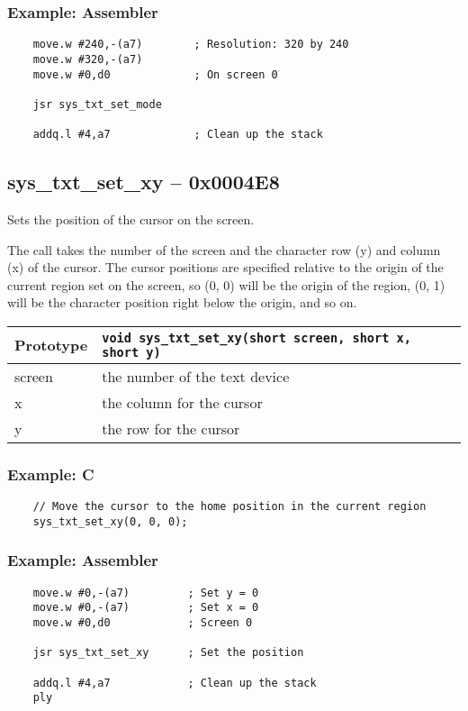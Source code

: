 \subsubsection*{Example: Assembler}
\begin{verbatim}
    move.w #240,-(a7)        ; Resolution: 320 by 240
    move.w #320,-(a7)
    move.w #0,d0             ; On screen 0
    
    jsr sys_txt_set_mode

    addq.l #4,a7             ; Clean up the stack
\end{verbatim}


\subsection*{sys\_txt\_set\_xy -- 0x0004E8}
Sets the position of the cursor on the screen.

The call takes the number of the screen and the character row (y) and column (x) of the cursor.
The cursor positions are specified relative to the origin of the current region set on the screen, so (0, 0)
will be the origin of the region, (0, 1) will be the character position right below the origin, and so on.

\bigskip

\begin{tabular}{|l||l|} \hline
Prototype & \lstinline!void sys_txt_set_xy(short screen, short x, short y)! \\ \hline
screen & the number of the text device \\ \hline
x & the column for the cursor \\ \hline
y & the row for the cursor \\ \hline
\end{tabular}

\subsubsection*{Example: C}
\begin{lstlisting}
    // Move the cursor to the home position in the current region
    sys_txt_set_xy(0, 0, 0);
\end{lstlisting}

\subsubsection*{Example: Assembler}
\begin{verbatim}
    move.w #0,-(a7)         ; Set y = 0
    move.w #0,-(a7)         ; Set x = 0
    move.w #0,d0            ; Screen 0

    jsr sys_txt_set_xy      ; Set the position

    addq.l #4,a7            ; Clean up the stack
    ply
\end{verbatim}

